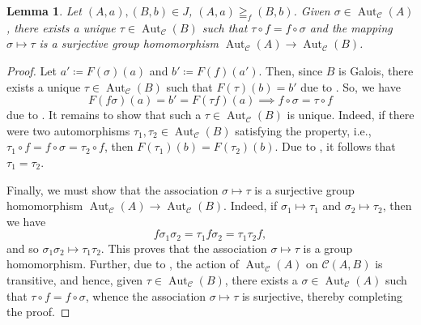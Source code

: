 \documentclass[10pt]{article}
\theoremstyle{thmstyle}
\newtheorem{lemma}[theorem]{Lemma}
\theoremstyle{defstyle}
\newcommand{\Aut}{\operatorname{Aut}}
\newcommand{\scrC}{\mathscr{C}} %
\begin{document}
\begin{lemma}
    Let $(A, a), (B, b)\in J$, $(A, a)\geqq_f (B, b)$. Given $\sigma\in\Aut_{\scrC}(A)$, there exists a unique $\tau\in\Aut_{\scrC}(B)$ such that $\tau\circ f = f\circ\sigma$ and the mapping $\sigma\mapsto\tau$ is a surjective group homomorphism $\Aut_{\scrC}(A)\to\Aut_{\scrC}(B)$.
\end{lemma}
\begin{proof}
    Let $a'\coloneq F(\sigma)(a)$ and $b'\coloneq F(f)(a')$. Then, since $B$ is Galois, there exists a unique $\tau\in\Aut_{\scrC}(B)$ such that $F(\tau)(b) = b'$ due to . So, we have 
    \begin{equation*}
        F(f\sigma)(a) = b' = F(\tau f)(a)\implies f\circ\sigma = \tau\circ f
    \end{equation*}
    due to . It remains to show that such a $\tau\in\Aut_{\scrC}(B)$ is unique. Indeed, if there were two automorphisms $\tau_1,\tau_2\in\Aut_{\scrC}(B)$ satisfying the property, i.e., $\tau_1\circ f = f\circ\sigma = \tau_2\circ f$, then $F(\tau_1)(b) = F(\tau_2)(b)$. Due to , it follows that $\tau_1 = \tau_2$. 

    Finally, we must show that the association $\sigma\mapsto\tau$ is a surjective group homomorphism $\Aut_{\scrC}(A)\to\Aut_{\scrC}(B)$. Indeed, if $\sigma_1\mapsto\tau_1$ and $\sigma_2\mapsto\tau_2$, then we have 
    \begin{equation*}
        f\sigma_1\sigma_2 = \tau_1 f\sigma_2 = \tau_1\tau_2 f,
    \end{equation*}
    and so $\sigma_1\sigma_2\mapsto\tau_1\tau_2$. This proves that the association $\sigma\mapsto\tau$ is a group homomorphism. Further, due to , the action of $\Aut_{\scrC}(A)$ on $\scrC(A, B)$ is transitive, and hence, given $\tau\in\Aut_{\scrC}(B)$, there exists a $\sigma\in\Aut_{\scrC}(A)$ such that $\tau\circ f = f\circ\sigma$, whence the association $\sigma\mapsto\tau$ is surjective, thereby completing the proof.
\end{proof}
\end{document}
